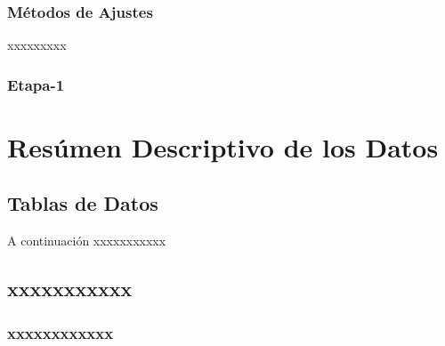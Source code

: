 \documentclass[12pt,a4paper,]{book}
\def\ifdoblecara{} %
\def\ifprincipal{} %
\numberwithin{dummy}{section}
\theoremstyle{ocrenumbox}
\theoremstyle{ocrenumbox}
\theoremstyle{ocrenumbox}
\theoremstyle{ocrenumbox}
\theoremstyle{ocrenum}
\begin{document}
\hypertarget{muxe9todos-de-ajustes}{%
\subsection{Métodos de Ajustes}\label{muxe9todos-de-ajustes}}

xxxxxxxxx

\hypertarget{etapa-1}{%
\subsection{Etapa-1}\label{etapa-1}}

\FloatBarrier

\ifdefined\ifprincipal
\else
\setlength{\parindent}{1em}
\pagestyle{fancy}
\setcounter{tocdepth}{4}
\tableofcontents

\fi

\ifdefined\ifdoblecara
\fancyhead{}{}
\fancyhead[LE,RO]{\scriptsize\rightmark}
\fancyfoot[LO,RE]{\scriptsize\slshape \leftmark}
\fancyfoot[C]{}
\fancyfoot[LE,RO]{\footnotesize\thepage}
\else
\fancyhead{}{}
\fancyhead[RO]{\scriptsize\rightmark}
\fancyfoot[LO]{\scriptsize\slshape \leftmark}
\fancyfoot[C]{}
\fancyfoot[RO]{\footnotesize\thepage}
\fi

\renewcommand{\headrulewidth}{0.4pt}
\renewcommand{\footrulewidth}{0.4pt}

\hypertarget{resuxfamen-descriptivo-de-los-datos}{%
\chapter{Resúmen Descriptivo de los
Datos}\label{resuxfamen-descriptivo-de-los-datos}}

\hypertarget{tablas-de-datos}{%
\section{Tablas de Datos}\label{tablas-de-datos}}

A continuación xxxxxxxxxxx

\hypertarget{xxxxxxxxxxx}{%
\section{xxxxxxxxxxx}\label{xxxxxxxxxxx}}

\hypertarget{xxxxxxxxxxxx}{%
\subsection{xxxxxxxxxxxx}\label{xxxxxxxxxxxx}}
\end{document}
